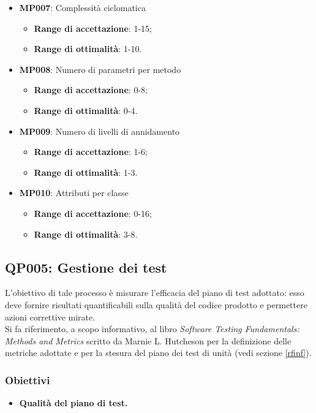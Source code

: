 \begin{itemize}
	\item \textbf{MP007}: Complessità ciclomatica
	\begin{itemize}
		\item \textbf{Range di accettazione}: 1-15;
		\item \textbf{Range di ottimalità}: 1-10.
	\end{itemize}
	\item \textbf{MP008}: Numero di parametri per metodo
	\begin{itemize}
		\item \textbf{Range di accettazione}: 0-8;
		\item \textbf{Range di ottimalità}: 0-4.
	\end{itemize}
	\item \textbf{MP009}: Numero di livelli di annidamento
	\begin{itemize}
		\item \textbf{Range di accettazione}: 1-6;
		\item \textbf{Range di ottimalità}: 1-3.
	\end{itemize}
	\item \textbf{MP010}: Attributi per classe
	\begin{itemize}
		\item \textbf{Range di accettazione}: 0-16;
		\item \textbf{Range di ottimalità}: 3-8.
	\end{itemize}
		
\end{itemize}

\subsection{QP005: Gestione dei test}\label{test}\label{pro5}
L'obiettivo di tale processo è misurare l'efficacia del piano di test adottato: esso deve fornire risultati quantificabili sulla qualità del codice prodotto e permettere azioni correttive mirate.\\
Si fa riferimento, a scopo informativo, al libro \textit{Software Testing Fundamentals: Methods and Metrics} scritto da Marnie L. Hutcheson per la definizione delle metriche adottate e per la stesura del piano dei test di unità (vedi sezione \ref{rfinf}).
\subsubsection{Obiettivi}
\begin{itemize}
	\item \textbf{Qualità del piano di test.} 
\end{itemize}

